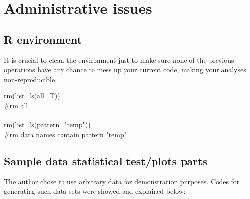 \documentclass[../note.tex]{subfiles} %
\begin{document}
\section{Administrative issues}

\subsection{R environment}
It is crucial to clean the environment just to make sure none of the previous operations have any chance to mess up your current code, making your analyses non-reproducible.
\begin{code}
rm(list=ls(all=T))\\\#rm all\\\\
rm(list=ls(pattern="temp"))\\\#rm data names contain pattern "temp"
\end{code}

\subsection{Sample data statistical test/plots parts}
The author chose to use arbitrary data for demonstration purposes.  Codes for generating such data sets were showed and explained below:
\end{document}

